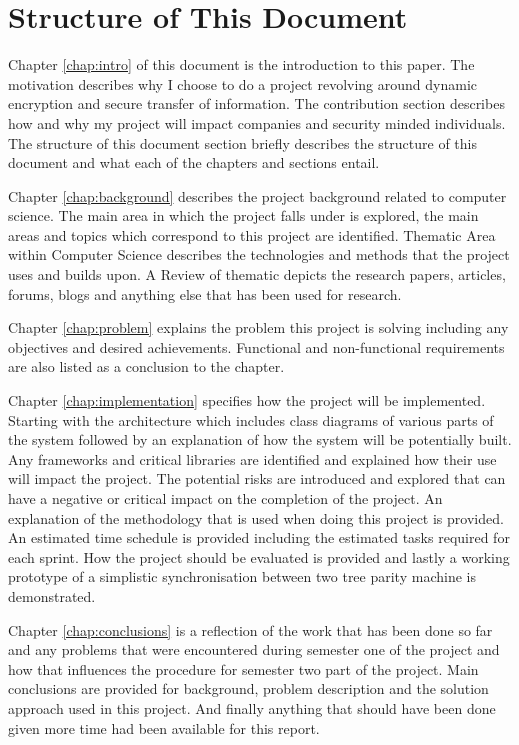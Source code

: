 \section{Structure of This Document}
Chapter \ref{chap:intro} of this document is the introduction to this paper. The motivation describes why I choose to do a project revolving around dynamic encryption and secure transfer of information. The contribution section describes how and why my project will impact companies and security minded individuals. The structure of this document section briefly describes the structure of this document and what each of the chapters and sections entail.

Chapter \ref{chap:background} describes the project background related to computer science. The main area in which the project falls under is explored, the main areas and topics which correspond to this project are identified. Thematic Area within Computer Science describes the technologies and methods that the project uses and builds upon. A Review of thematic depicts the research papers, articles, forums, blogs and anything else that has been used for research.

Chapter \ref{chap:problem} explains the problem this project is solving including any objectives and desired achievements. Functional and non-functional requirements are also listed as a conclusion to the chapter.

Chapter \ref{chap:implementation} specifies how the project will be implemented. Starting with the architecture which includes class diagrams of various parts of the system followed by an explanation of how the system will be potentially built. Any frameworks and critical libraries are identified and explained how their use will impact the project. The potential risks are introduced and explored that can have a negative or critical impact on the completion of the project. An explanation of the methodology that is used when doing this project is provided. An estimated time schedule is provided including the estimated tasks required for each sprint. How the project should be evaluated is provided and lastly a working prototype of a simplistic synchronisation between two tree parity machine is demonstrated.

Chapter \ref{chap:conclusions} is a reflection of the work that has been done so far and any problems that were encountered during semester one of the project and how that influences the procedure for semester two part of the project. Main conclusions are provided for background, problem description and the solution approach used in this project. And finally anything that should have been done given more time had been available for this report.
